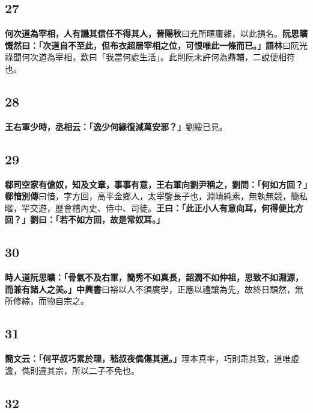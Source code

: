 \subsection*{27}

\textbf{何次道為宰相，人有譏其信任不得其人，}{\footnotesize \textbf{晉陽秋}曰充所暱庸雜，以此損名。}\textbf{阮思曠慨然曰：「次道自不至此，但布衣超居宰相之位，可恨唯此一條而已。」}{\footnotesize \textbf{語林}曰阮光祿聞何次道為宰相，歎曰「我當何處生活」。此則阮未許何為鼎輔，二說便相符也。}

\subsection*{28}

\textbf{王右軍少時，丞相云：「逸少何緣復減萬安邪？」}{\footnotesize 劉綏已見。}

\subsection*{29}

\textbf{郗司空家有傖奴，知及文章，事事有意，王右軍向劉尹稱之，劉問：「何如方回？」}{\footnotesize \textbf{郗愔別傳}曰愔，字方回，高平金鄉人，太宰鑒長子也，淵靖純素，無執無競，簡私暱，罕交遊，歷會稽內史、侍中、司徒。}\textbf{王曰：「此正小人有意向耳，何得便比方回？」劉曰：「若不如方回，故是常奴耳。」}

\subsection*{30}

\textbf{時人道阮思曠：「骨氣不及右軍，簡秀不如真長，韶潤不如仲祖，思致不如淵源，而兼有諸人之美。」}{\footnotesize \textbf{中興書}曰裕以人不須廣學，正應以禮讓為先，故終日頹然，無所修綜，而物自宗之。}

\subsection*{31}

\textbf{簡文云：「何平叔巧累於理，嵇叔夜儁傷其道。」}{\footnotesize 理本真率，巧則乖其致，道唯虛澹，儁則違其宗，所以二子不免也。}

\subsection*{32}

